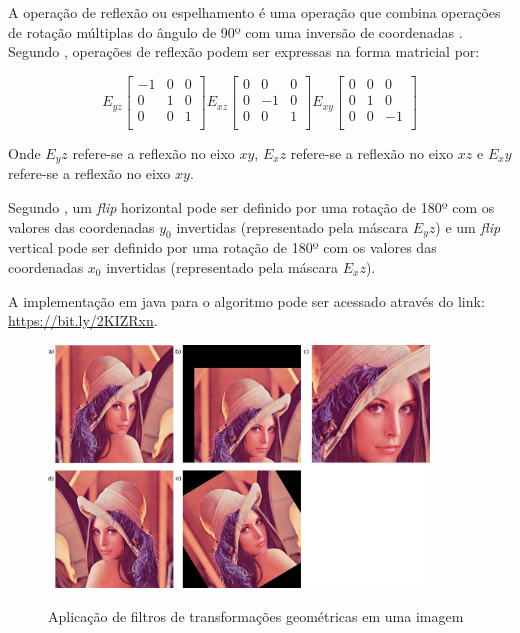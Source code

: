\documentclass[
	12pt,				%
	oneside,			%
	a4paper,			%
	english,			%
	french,				%
	spanish,			%
	brazil,				%
	]{abntex2}
\begin{document}
A operação de reflexão ou espelhamento é uma operação que combina operações de rotação múltiplas do ângulo de 90º com uma inversão de coordenadas \cite{conciAzevedoLeta:2008}. Segundo \citet{pedriniSchwartz:2008}, operações de reflexão podem ser expressas na forma matricial por:

\[
E_{yz}
\begin{bmatrix}
    -1 & 0 & 0  \\ 
	 0 & 1 & 0  \\ 
	 0 & 0 & 1  \\ 
\end{bmatrix} 
E_{xz}
\begin{bmatrix}
    0 &  0 & 0   \\ 
	0 & -1 & 0   \\ 
	0 &  0 & 1   \\ 
\end{bmatrix} 
E_{xy}
\begin{bmatrix}
    0 & 0 &  0  \\ 
	0 & 1 &  0  \\ 
	0 & 0 & -1  \\ 
\end{bmatrix} 
\]

Onde \(E_yz\) refere-se a reflexão no eixo \(xy\), \(E_xz\) refere-se a reflexão no eixo \(xz\) e \(E_xy\) refere-se a reflexão no eixo \(xy\).

Segundo \citet{conciAzevedoLeta:2008}, um \textit{flip} horizontal pode ser definido por uma rotação de 180º com os valores das coordenadas \(y_0\) invertidas (representado pela máscara \(E_yz\)) e um \textit{flip} vertical pode ser definido por uma rotação de 180º com os valores das coordenadas \(x_0\) invertidas (representado pela máscara \(E_xz\)).

A implementação em java para o algoritmo pode ser acessado através do link: \url{https://bit.ly/2KIZRxn}.

\begin{figure}[ht]
\centering
\caption{Aplicação de filtros de transformações geométricas em uma imagem}
\includegraphics[width=0.9\textwidth]{imagens/transformacoesgeometricas.png}
\sourceAuthor
\label{fig:transformacoesgeometricas}
\end{figure}
\end{document}

